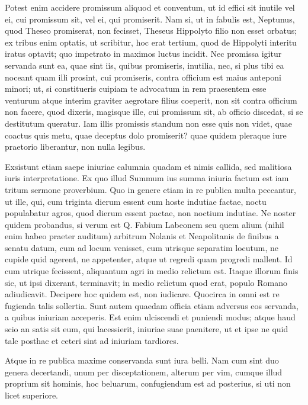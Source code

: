  Potest enim accidere promissum aliquod et conventum, ut id effici sit inutile vel ei, cui promissum sit, vel ei, qui promiserit. Nam si, ut in fabulis est, Neptunus, quod Theseo promiserat, non fecisset, Theseus Hippolyto filio non esset orbatus; ex tribus enim optatis, ut scribitur, hoc erat tertium, quod de Hippolyti interitu iratus optavit; quo impetrato in maximos luctus incidit. Nec promissa igitur servanda sunt ea, quae sint iis, quibus promiseris, inutilia, nec, si plus tibi ea noceant quam illi prosint, cui promiseris, contra officium est maius anteponi minori; ut, si constitueris cuipiam te advocatum in rem praesentem esse venturum atque interim graviter aegrotare filius coeperit, non sit contra officium non facere, quod dixeris, magisque ille, cui promissum sit, ab officio discedat, si se destitutum queratur. Iam illis promissis standum non esse quis non videt, quae coactus quis metu, quae deceptus dolo promiserit? quae quidem pleraque iure praetorio liberantur, non nulla legibus.

 Exsistunt etiam saepe iniuriae calumnia quadam et nimis callida, sed malitiosa iuris interpretatione. Ex quo illud Summum ius summa iniuria factum est iam tritum sermone proverbium. Quo in genere etiam in re publica multa peccantur, ut ille, qui, cum triginta dierum essent cum hoste indutiae factae, noctu populabatur agros, quod dierum essent pactae, non noctium indutiae. Ne noster quidem probandus, si verum est Q. Fabium Labeonem seu quem alium (nihil enim habeo praeter auditum) arbitrum Nolanis et Neapolitanis de finibus a senatu datum, cum ad locum venisset, cum utrisque separatim locutum, ne cupide quid agerent, ne appetenter, atque ut regredi quam progredi mallent. Id cum utrique fecissent, aliquantum agri in medio relictum est. Itaque illorum finis sic, ut ipsi dixerant, terminavit; in medio relictum quod erat, populo Romano adiudicavit. Decipere hoc quidem est, non iudicare. Quocirca in omni est re fugienda talis sollertia. Sunt autem quaedam officia etiam adversus eos servanda, a quibus iniuriam acceperis. Est enim ulciscendi et puniendi modus; atque haud scio an satis sit eum, qui lacessierit, iniuriae suae paenitere, ut et ipse ne quid tale posthac et ceteri sint ad iniuriam tardiores.

 Atque in re publica maxime conservanda sunt iura belli. Nam cum sint duo genera decertandi, unum per disceptationem, alterum per vim, cumque illud proprium sit hominis, hoc beluarum, confugiendum est ad posterius, si uti non licet superiore.

